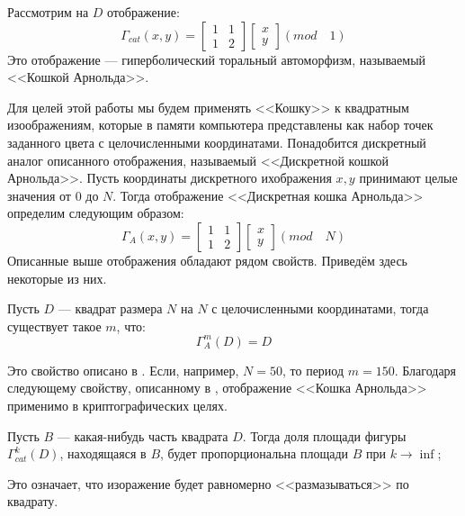 Рассмотрим на $D$ отображение:
$$\Gamma_{cat}(x,y) = \begin{bmatrix} 1 & 1 \\ 1 & 2 \end{bmatrix}\begin{bmatrix} x \\ y \end{bmatrix} (mod \quad 1)$$
Это отображение --- гиперболический торальный автоморфизм, называемый <<Кошкой Арнольда>>. 

Для целей этой работы мы будем применять <<Кошку>> к квадратным изоображениям, которые в памяти компьютера представлены как набор точек заданного цвета с целочисленными координатами. Понадобится дискретный аналог описанного отображения, называемый <<Дискретной кошкой Арнольда>>.
Пусть координаты дискретного ихображения $x,y$ принимают целые значения от $0$ до $N$. Тогда отображение <<Дискретная кошка Арнольда>> определим следующим образом:
$$\Gamma_{A}(x,y) = \begin{bmatrix} 1 & 1 \\ 1 & 2 \end{bmatrix}\begin{bmatrix} x \\ y \end{bmatrix} (mod \quad N)$$
Описанные выше отображения обладают рядом свойств. Приведём здесь некоторые из них.
\begin{myproperty}Пусть $D$ --- квадрат размера $N$ на $N$ с целочисленными координатами, тогда существует такое $m$, что:
$$\Gamma_{A}^{m}(D) = D$$
\end{myproperty}
Это свойство описано в \autocite{cat}. Если, например, $N = 50$, то период $m = 150$.
Благодаря следующему свойству, описанному в \autocite{arn}, отображение <<Кошка Арнольда>> применимо в криптографических целях. 
\begin{myproperty}Пусть $B$ --- какая-нибудь часть квадрата $D$. Тогда доля площади фигуры $\Gamma_{cat}^{k}(D)$, находящаяся в $B$, будет пропорциональна площади $B$ при $k\rightarrow\inf$;$$$$
\end{myproperty}
Это означает, что изоражение будет равномерно  <<размазываться>> по квадрату.